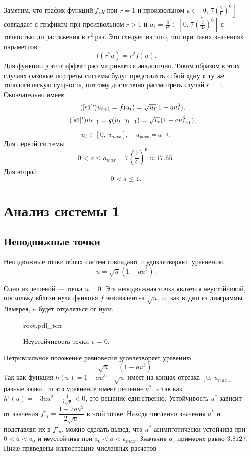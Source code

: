 \documentclass[16pt]{article}
\newcommand{\incfig}[2]{%
    \def\svgwidth{#2 mm}
    {#1.pdf_tex}
}
\newcommand\Pict[3]{
\begin{figure}[h!]
    \centering
    \incfig{#1}{#3}
    \caption{#2}
    \label{fig:#1}
\end{figure}
}
\begin{document}
Заметим, что график функций $f, g$ при $r = 1$ и произвольном $a \in \left[0,\,7\left(\frac{7}{6}\right)^6\right]$ совпадает с графиком при
произвольном $r > 0$ и $a_1 = \frac{a}{r^6} \in \left[0,\,7\left(\frac{7}{6r}\right)^6\right]$ с точностью
до растяжения в $r^2$ раз. Это следует из того, что при таких значениях параметров
$$f(r^2u) = r^2f(u).$$
Для функции $g$ этот эффект рассматривается аналогично.
Таким образом в этих случаях фазовые портреты системы будут предсталять собой одну и ту же топологическую сущность,
поэтому достаточно рассмотреть случай $r = 1$.
Окончательно имеем
\begin{equation} \tag{\ref{s1}$'$} \label{ss1}
u_{t+1} = f(u_t) = \sqrt{u_t}(1 - au_t^3),
\end{equation} 
\begin{equation} \tag{\ref{s2}$'$} \label{ss2}
u_{t+1} = g(u_t, u_{t-1}) = \sqrt{u_t}(1 - au_{t-1}^3),
\end{equation}
$$u_t \in [0,\, u_{max}],\quad u_{max} = a^{-\frac{1}{3}}.$$
Для первой системы $$0 < a \leqslant a_{max} = 7\left(\dfrac{7}{6}\right)^6 \approx 17.65.$$
Для второй $$0 < a \leqslant 1.$$

\section{Анализ системы 1}
\subsection{Неподвижные точки}
Неподвижные точки обоих систем совпадают и удовлетворяют уравнению
$$u = \sqrt{u}(1 - au^3).$$

Одно из решений --- точка $u = 0$. Эта неподвижная точка является неустойчивой, поскольку вблизи нуля функция $f$
эквивалентна $\sqrt{u}$, и, как видно из диаграммы Ламерея, $u$ будет отдаляться от нуля.
\Pict{root}{Неустойчивость точки $u = 0$.}{70}

Нетривиальное положение равновесия удовлетворяет уравению
$$\sqrt{u} = (1 - au^3).$$
Так как функция $h(u) = 1 - au^3 - \sqrt{u}$ имеет на концах отрезка $[0,\, u_{max}]$ разные знаки, то
это уравнение имеет решение $u^*$, а так как $h'(u) = -3au^2 - \frac{1}{2\sqrt{u}} < 0$, это решение единственно.
%
Устойчивость $u^*$ зависит от значения $f'_u = \dfrac{1-7au^3}{2\sqrt{u}}$ в этой точке. Находя численно значения
$u^*$ и подставляя их в $f'_u$, можно сделать вывод, что $u^*$ асимптотически устойчива при $0 < a < a_0$ и
неустойчива при $a_0 < a < a_{max}$. Значение $a_0$ примерно равно $3.8127$. Ниже приведены иллюстрации численных
расчетов.
\newpage
\end{document}
